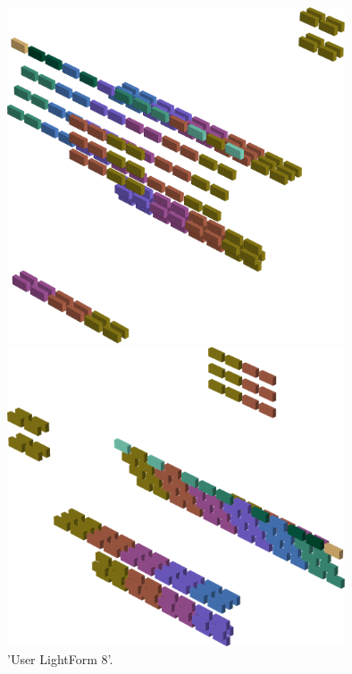 \begin{figure}[H]
    \centering
    \begin{adjustbox}{width=10cm,center}
      \includegraphics[width=10cm]{src/colorspace_patterns/pattern16-45.png}%
    \end{adjustbox}
    \begin{adjustbox}{width=10cm}
      \includegraphics[width=10cm]{src/colorspace_patterns/pattern16-225.png}%
    \end{adjustbox}
\caption{'User LightForm 8'.}
\end{figure}
\clearpage

